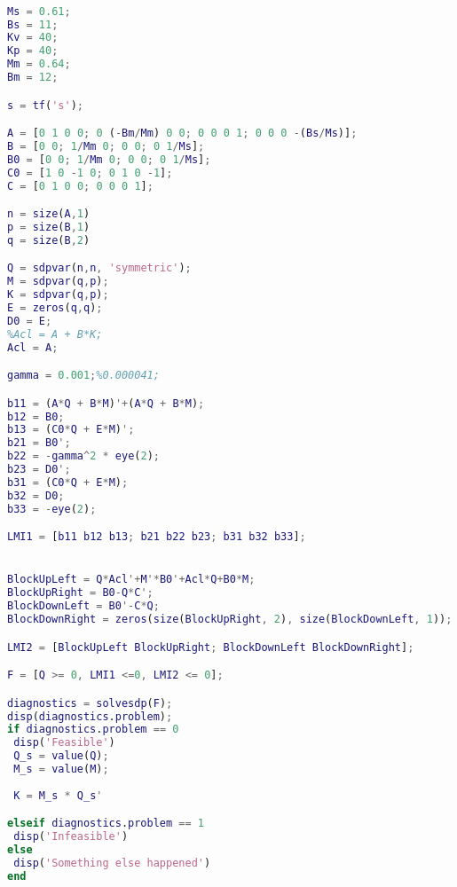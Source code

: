 \documentclass{article}
\begin{document}
\begin{lstlisting}[language=Matlab]

Ms = 0.61;
Bs = 11;
Kv = 40;
Kp = 40;
Mm = 0.64;
Bm = 12;

s = tf('s');

A = [0 1 0 0; 0 (-Bm/Mm) 0 0; 0 0 0 1; 0 0 0 -(Bs/Ms)];
B = [0 0; 1/Mm 0; 0 0; 0 1/Ms];
B0 = [0 0; 1/Mm 0; 0 0; 0 1/Ms];
C0 = [1 0 -1 0; 0 1 0 -1];
C = [0 1 0 0; 0 0 0 1];

n = size(A,1)
p = size(B,1)
q = size(B,2)

Q = sdpvar(n,n, 'symmetric');
M = sdpvar(q,p);
K = sdpvar(q,p);
E = zeros(q,q);
D0 = E;
%Acl = A + B*K;
Acl = A;

gamma = 0.001;%0.000041;

b11 = (A*Q + B*M)'+(A*Q + B*M);
b12 = B0;
b13 = (C0*Q + E*M)';
b21 = B0';
b22 = -gamma^2 * eye(2);
b23 = D0';
b31 = (C0*Q + E*M);
b32 = D0;
b33 = -eye(2);

LMI1 = [b11 b12 b13; b21 b22 b23; b31 b32 b33];


BlockUpLeft = Q*Acl'+M'*B0'+Acl*Q+B0*M;
BlockUpRight = B0-Q*C';
BlockDownLeft = B0'-C*Q;
BlockDownRight = zeros(size(BlockUpRight, 2), size(BlockDownLeft, 1));

LMI2 = [BlockUpLeft BlockUpRight; BlockDownLeft BlockDownRight];

F = [Q >= 0, LMI1 <=0, LMI2 <= 0];

diagnostics = solvesdp(F);
disp(diagnostics.problem);
if diagnostics.problem == 0
 disp('Feasible')
 Q_s = value(Q);
 M_s = value(M);
 
 K = M_s * Q_s'

elseif diagnostics.problem == 1
 disp('Infeasible')
else
 disp('Something else happened')
end



\end{lstlisting}
\end{document}
